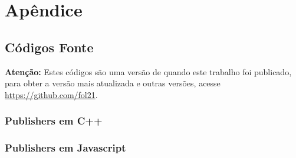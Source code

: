 

\chapter{Apêndice}
\label{chapter:apendice}

\section{Códigos Fonte}
\label{section:codigos_fonte}

\textbf{Atenção:} Estes códigos são uma versão de quando este trabalho foi publicado, para obter a versão mais atualizada e outras versões, acesse \url{https://github.com/fol21}.

\subsection{Publishers em C++}
\label{subsection:publishers_cpp}












\subsection{Publishers em Javascript}
\label{subsection:publishers_javascript}






